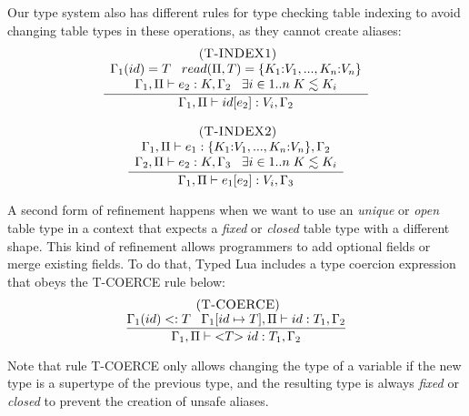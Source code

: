 Our type system also has different rules for type checking table indexing to avoid
changing table types in these operations, as they cannot create aliases:
\[
\begin{array}{c}
\begin{array}{c}
\; (\textsc{T-INDEX1})\\
\dfrac{\begin{array}{c}
       \Gamma_{1}(id) = T \;\;\;
       read(\Pi, T) = \{K_{1}{:}V_{1}, ..., K_{n}{:}V_{n}\}\\
       \Gamma_{1}, \Pi \vdash e_{2}:K, \Gamma_{2} \;\;\;
       \exists i \in 1{..}n \; K \lesssim K_{i}
       \end{array}}
      {\Gamma_{1}, \Pi \vdash id[e_{2}]:V_{i}, \Gamma_{2}}
\end{array}
\\ \\
\begin{array}{c}
\; (\textsc{T-INDEX2})\\
\dfrac{\begin{array}{c}
       \Gamma_{1}, \Pi \vdash e_{1}:\{K_{1}{:}V_{1}, ..., K_{n}{:}V_{n}\}, \Gamma_{2}\\
       \Gamma_{2}, \Pi \vdash e_{2}:K, \Gamma_{3} \;\;\;
       \exists i \in 1{..}n \; K \lesssim K_{i}
       \end{array}}
      {\Gamma_{1}, \Pi \vdash e_{1}[e_{2}]:V_{i}, \Gamma_{3}}
\end{array}
\end{array}
\]


A second form of refinement happens when we want to use an
\emph{unique} or \emph{open} table type in a context that expects a
\emph{fixed} or \emph{closed} table type with a different shape.
This kind of refinement allows programmers to add optional fields
or merge existing fields.
To do that, Typed Lua includes a type coercion expression that
obeys the \textsc{T-COERCE} rule below:
\[
\begin{array}{c}
\; (\textsc{T-COERCE})\\
\dfrac{\Gamma_{1}(id) <: T \;\;\;
       \Gamma_{1}[id \mapsto T], \Pi \vdash id:T_{1}, \Gamma_{2}}
      {\Gamma_{1}, \Pi \vdash {<}T{>} \; id:T_{1}, \Gamma_{2}}
\end{array}
\]

Note that rule \textsc{T-COERCE} only allows changing the type
of a variable if the new type is a supertype of the previous type,
and the resulting type is always \emph{fixed} or \emph{closed}
to prevent the creation of unsafe aliases.

